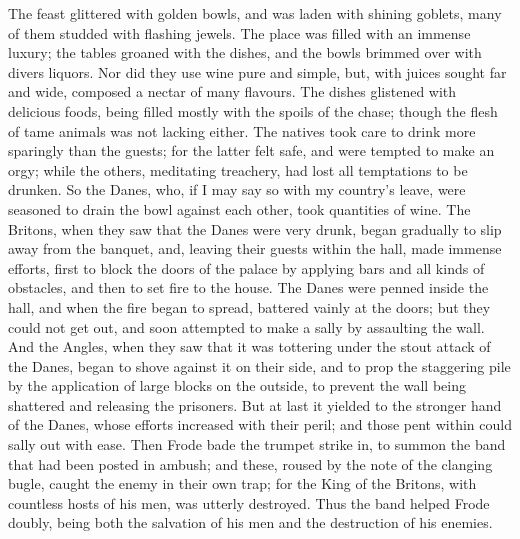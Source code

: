 \documentclass[10pt,a4paper]{report}
\begin{document}
The feast glittered with golden bowls, and was laden with shining goblets, many of them studded with flashing jewels. The place was filled with an immense luxury; the tables groaned with the dishes, and the bowls brimmed over with divers liquors. Nor did they use wine pure and simple, but, with juices sought far and wide, composed a nectar of many flavours. The dishes glistened with delicious foods, being filled mostly with the spoils of the chase; though the flesh of tame animals was not lacking either. The natives took care to drink more sparingly than the guests; for the latter felt safe, and were tempted to make an orgy; while the others, meditating treachery, had lost all temptations to be drunken. So the Danes, who, if I may say so with my country's leave, were seasoned to drain the bowl against each other, took quantities of wine. The Britons, when they saw that the Danes were very drunk, began gradually to slip away from the banquet, and, leaving their guests within the hall, made immense efforts, first to block the doors of the palace by applying bars and all kinds of obstacles, and then to set fire to the house. The Danes were penned inside the hall, and when the fire began to spread, battered vainly at the doors; but they could not get out, and soon attempted to make a sally by assaulting the wall. And the Angles, when they saw that it was tottering under the stout attack of the Danes, began to shove against it on their side, and to prop the staggering pile by the application of large blocks on the outside, to prevent the wall being shattered and releasing the prisoners. But at last it yielded to the stronger hand of the Danes, whose efforts increased with their peril; and those pent within could sally out with ease. Then Frode bade the trumpet strike in, to summon the band that had been posted in ambush; and these, roused by the note of the clanging bugle, caught the enemy in their own trap; for the King of the Britons, with countless hosts of his men, was utterly destroyed. Thus the band helped Frode doubly, being both the salvation of his men and the destruction of his enemies.\\
\end{document}
